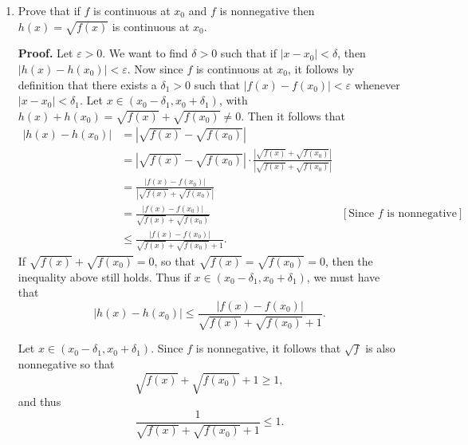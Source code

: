 \documentclass[9pt]{article}
\begin{document}
\begin{enumerate}
   \item Prove that if $f$ is continuous at $x_0$ and $f$ is nonnegative then
         $h(x) = \sqrt{f(x)}$ is continuous at $x_0$.
         
      \textbf{Proof.} Let $\varepsilon > 0$. We want to find $\delta > 0$ such
      that if $|x - x_0| < \delta$, then $|h(x) - h(x_0)| < \varepsilon$. Now
      since $f$ is continuous at $x_0$, it follows by definition that there
      exists a $\delta_1 > 0$ such that $|f(x) - f(x_0)| < \varepsilon$
      whenever $|x - x_0| < \delta_1$. Let
      $x \in (x_0 - \delta_1, x_0 + \delta_1)$, with
      $h(x) + h(x_0) = \sqrt{f(x)} + \sqrt{f(x_0)}\neq 0$.
      Then it follows that
      \begin{align*}
         |h(x) - h(x_0)| &= |\sqrt{f(x)} - \sqrt{f(x_0)}| \\
                         &= |\sqrt{f(x)} - \sqrt{f(x_0)}| \cdot
                            \frac{|\sqrt{f(x)} + \sqrt{f(x_0)}|}
                                 {|\sqrt{f(x)} + \sqrt{f(x_0)}|} \\
                         &= \frac{|f(x) - f(x_0)|}
                                 {|\sqrt{f(x)} + \sqrt{f(x_0)}|} \\
                         &= \frac{|f(x) - f(x_0)|}
                                 {\sqrt{f(x)} + \sqrt{f(x_0)}}
                            &[\text{Since }f \text{ is nonnegative}] \\
                         &\le \frac{|f(x) - f(x_0)|}
                                 {\sqrt{f(x)} + \sqrt{f(x_0)} + 1}.
      \end{align*}
      If $\sqrt{f(x)} + \sqrt{f(x_0)} = 0$, so that
      $\sqrt{f(x)} = \sqrt{f(x_0)} = 0$, then the inequality above still holds.
      Thus if $x \in (x_0 - \delta_1, x_0 + \delta_1)$, we must have that
      $$|h(x) - h(x_0)| \le \frac{|f(x) - f(x_0)|}
                                 {\sqrt{f(x)} + \sqrt{f(x_0)} + 1}.$$
                                 
      Let $x \in (x_0 - \delta_1, x_0 + \delta_1)$. Since $f$ is nonnegative, it
      follows that $\sqrt{f}$ is also nonnegative
      so that
      $$\sqrt{f(x)} + \sqrt{f(x_0)} + 1 \ge 1, $$
      and thus
      \begin{equation}
         \frac{1}{\sqrt{f(x)} + \sqrt{f(x_0)} + 1} \le 1. \label{eq_a}
      \end{equation}
      

\end{enumerate}
\end{document}
